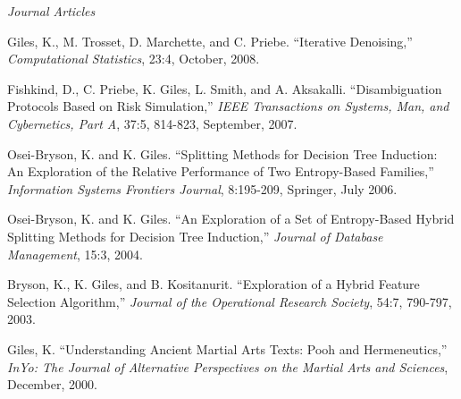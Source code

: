 \documentclass[11pt,article,oneside]{memoir}
\begin{document}




\noindent\emph{Journal Articles \vspace{0.05in}}
 

\ind Giles, K., M. Trosset, D. Marchette, and C. Priebe. “Iterative Denoising,” \emph{Computational Statistics}, 23:4, October, 2008.

\ind Fishkind, D., C. Priebe, K. Giles, L. Smith, and A. Aksakalli. “Disambiguation Protocols Based on Risk Simulation,” \emph{IEEE Transactions on Systems, Man, and Cybernetics, Part A}, 37:5, 814-823, September, 2007.

\ind Osei-Bryson, K. and K. Giles. “Splitting Methods for Decision Tree Induction: An Exploration of the Relative Performance of Two Entropy-Based Families,” \emph{Information Systems Frontiers Journal}, 8:195-209, Springer, July 2006.



\ind Osei-Bryson, K. and K. Giles. “An Exploration of a Set of Entropy-Based Hybrid Splitting Methods for Decision Tree Induction,” \emph{Journal of Database Management}, 15:3, 2004.


\ind Bryson, K., K. Giles, and B. Kositanurit. “Exploration of a Hybrid Feature Selection Algorithm,” \emph{Journal of the Operational Research Society}, 54:7, 790-797, 2003.


\ind Giles, K. “Understanding Ancient Martial Arts Texts: Pooh and Hermeneutics,” \emph{InYo: The Journal of Alternative Perspectives on the Martial Arts and Sciences}, December, 2000.




\end{document}
